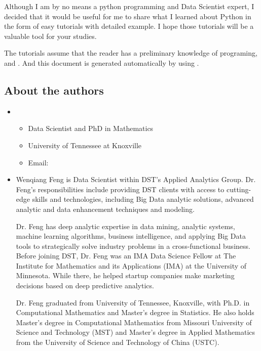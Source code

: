 \documentclass[letterpaper,12pt,english]{sphinxmanual}
\begin{document}
Although I am by no means a python programming and Data Scientist expert,
I decided that it would be useful for me to share what I learned
about Python in the form of easy tutorials with detailed example.
I hope those tutorials will be a valuable tool for your studies.

The tutorials assume that the reader has a preliminary knowledge of  programing,  and . And this document is generated automatically by using .


\subsection{About the authors}
\label{\detokenize{preface:sphinx}}\label{\detokenize{preface:about-the-authors}}\begin{itemize}
\item {} 
\begin{itemize}
\item {} 
Data Scientist and PhD in Mathematics

\item {} 
University of Tennessee at Knoxville

\item {} 
Email: 

\end{itemize}

\item {} 

Wenqiang Feng is Data Scientist within DST’s Applied Analytics Group. Dr. Feng’s responsibilities include providing DST clients with access to cutting-edge skills and technologies, including Big Data analytic solutions, advanced analytic and data enhancement techniques and modeling.

Dr. Feng has deep analytic expertise in data mining, analytic systems, machine learning algorithms, business intelligence, and applying Big Data tools to strategically solve industry problems in a cross-functional business. Before joining DST, Dr. Feng was an IMA Data Science Fellow at The Institute for Mathematics and its Applications (IMA) at the University of Minnesota. While there, he helped startup companies make marketing decisions based on deep predictive analytics.

Dr. Feng graduated from University of Tennessee, Knoxville, with Ph.D. in Computational Mathematics and Master’s degree in Statistics. He also holds Master’s degree in Computational Mathematics from Missouri University of Science and Technology (MST) and Master’s degree in Applied Mathematics from the University of Science and Technology of China (USTC).


\end{itemize}
\end{document}
